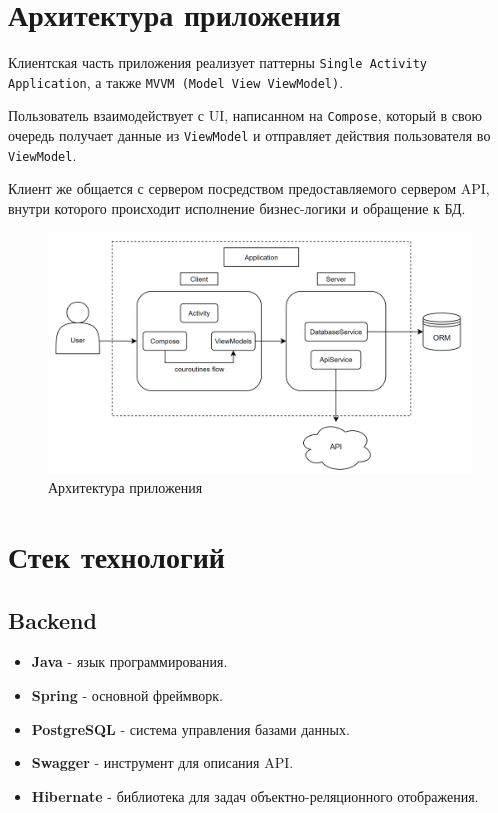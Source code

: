 \documentclass[a4paper, 14pt]{article}
\begin{document}
\section{Архитектура приложения}

Клиентская часть приложения реализует паттерны \texttt{Single Activity Application}, а также \texttt{MVVM (Model View ViewModel)}.

Пользователь взаимодействует с UI, написанном на \texttt{Compose}, который в свою очередь получает данные из \texttt{ViewModel} и отправляет действия пользователя во \texttt{ViewModel}.

Клиент же общается с сервером посредством предоставляемого сервером API, внутри которого происходит исполнение бизнес-логики и обращение к БД.

\begin{figure}[H]
    \centering
    \includegraphics[width=19cm]{resources/2.png}
    \caption{Архитектура приложения}
\end{figure}

\section{Стек технологий}

\subsection{Backend}

\begin{itemize}
    \item \textbf{Java} - язык программирования.
    \item \textbf{Spring} - основной фреймворк.
    \item \textbf{PostgreSQL} - система управления базами данных.
    \item \textbf{Swagger} - инструмент для описания API.
    \item \textbf{Hibernate} - библиотека для задач объектно-реляционного отображения.
\end{itemize}
\end{document}

